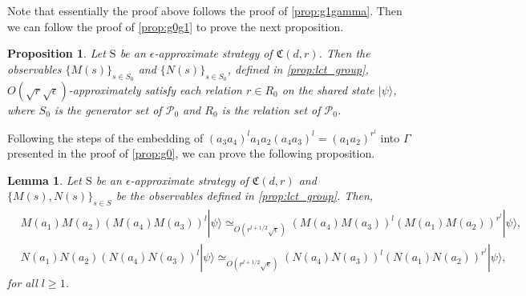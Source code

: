 \documentclass[11pt,letterpaper]{article}
\newcommand{\ket}[1]{|#1\rangle}
\newcommand{\1}{\mathbb{1}}
\newcommand{\Pg}{\mathcal{P}}
\newcommand{\fC}{\mathfrak{C}}
\newcommand{\bS}{\mathrm{S}}
\newcommand{\ep}{\epsilon}
\newcommand{\se}{\sqrt{\epsilon}}
\newcommand{\sr}{\sqrt{r}}
\newcommand{\appd}[1]{\simeq_{#1}}
\newtheorem{lemma}[theorem]{Lemma}
\newtheorem{proposition}[theorem]{Proposition}
\theoremstyle{definition}
\begin{document}
Note that essentially the proof above follows the proof of 
\cref{prop:g1gamma}. Then we can follow the proof of \cref{prop:g0g1}
to prove the next proposition.
\begin{proposition}
    \label{prop:lct_pg0}
    Let $\bS$ be an $\ep$-approximate strategy of $\fC(d,r)$.
	Then the observables $\{ M(s) \}_{s \in S_0}$ and 
	$\{N(s)\}_{s \in S_0}$, defined in 
\cref{prop:lct_group}, $O(\sr \se)$-approximately satisfy
	each relation $r \in R_0$ on the shared state $\ket{\psi}$, 
	where $S_0$ is the generator set of $\Pg_0$
    and $R_0$ is the relation set of $\Pg_0$.	
\end{proposition}
Following the steps of the embedding of $(a_3a_4)^l a_1a_2(a_4a_3)^l = (a_1a_2)^{r^l}$ into $\Gamma$ presented in
the proof of \cref{prop:g0},
we can prove the following proposition.
\begin{lemma}
\label{prop:lct_adv}
Let $\bS$ be an $\ep$-approximate strategy of $\fC(d,r)$ and $\{M(s), N(s)\}_{s \in S}$ be the observables defined in 
\cref{prop:lct_group}. 
Then,
\begin{align}
	&M(a_1)M(a_2) (M(a_4)M(a_3))^l \ket{\psi}\appd{O(r^{l+1/2} \se)} (M(a_4)M(a_3))^l (M(a_1)M(a_2))^{r^l} \ket{\psi}, \\
	&N(a_1)N(a_2) (N(a_4)N(a_3))^l \ket{\psi}\appd{O(r^{l+1/2} \se)} (N(a_4)N(a_3))^l (N(a_1)N(a_2))^{r^l} \ket{\psi}, 
\end{align}
for all $l \geq 1$.
\end{lemma}
\end{document}
